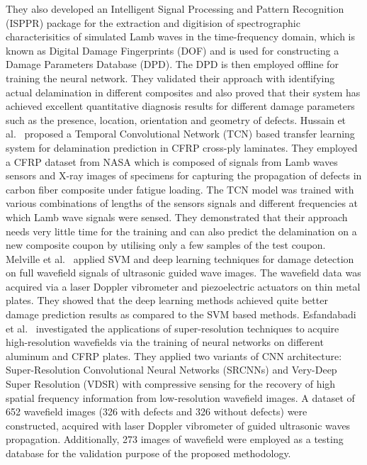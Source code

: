 They also developed an Intelligent Signal Processing and Pattern Recognition (ISPPR) package for the extraction and digitision of spectrographic characterisitics of simulated Lamb waves in the time-frequency domain, which is known as Digital Damage Fingerprints (DOF) and is used for constructing a Damage Parameters Database (DPD). 
The DPD is then employed offline for training the neural network. 
They validated their approach with identifying actual delamination in different composites and also proved that their system has achieved excellent quantitative diagnosis results for different damage parameters such as the presence, location, orientation and geometry of defects. 
Hussain et al.~\cite{hussaintemporal} proposed a Temporal Convolutional Network (TCN) based transfer learning system for delamination prediction in CFRP cross-ply laminates. They employed a CFRP dataset from NASA which is composed of signals from Lamb waves sensors and X-ray images of specimens for capturing the propagation of defects in carbon fiber composite under fatigue loading. 
The TCN model was trained with various combinations of lengths of the sensors signals and different frequencies at which Lamb wave signals were sensed. 
They demonstrated that their approach needs very little time for the training and can also predict the delamination on a new composite coupon by utilising only a few samples of the test coupon. 
Melville et al.~\cite{melville2018structural} applied SVM and deep learning techniques for damage detection on full wavefield signals of ultrasonic guided wave images. The wavefield data was acquired via a laser Doppler vibrometer and piezoelectric actuators on thin metal plates. 
They showed that the deep learning methods achieved quite better damage prediction results as compared to the SVM based methods. 
Esfandabadi et al.~\cite{keshmiri2019deep} investigated the applications of super-resolution techniques to acquire high-resolution wavefields via the training of neural networks on different aluminum and CFRP plates. 
They applied two variants of CNN architecture: Super-Resolution Convolutional Neural Networks (SRCNNs) and Very-Deep Super Resolution (VDSR) with compressive sensing for the recovery of high spatial frequency information from low-resolution wavefield images. 
A dataset of 652 wavefield images (326 with defects and 326 without defects) were constructed, acquired with laser Doppler vibrometer of guided ultrasonic waves propagation.
Additionally, 273 images of wavefield were employed as a testing database for the validation purpose of the proposed methodology.           

